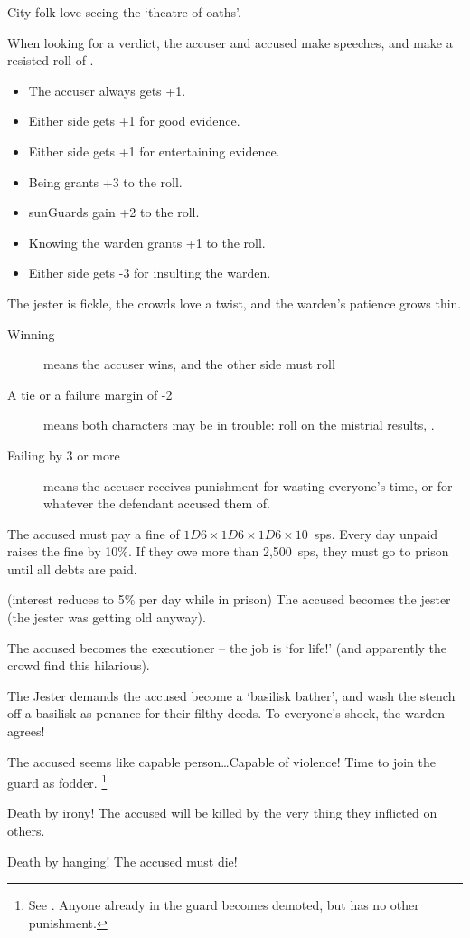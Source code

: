 \begin{multicols}{2}
City-folk love seeing the `theatre of oaths'.

When looking for a verdict, the accuser and accused make speeches, and make a resisted roll of .

\begin{itemize}
  \item
  The accuser always gets +1.
  \item
  Either side gets +1 for good evidence.
  \item
  Either side gets +1 for entertaining evidence.
  \item
  Being  grants +3 to the roll.
  \item
  \Glspl{sunGuard} gain +2 to the roll.
  \item
  Knowing the \gls{warden} grants +1 to the roll.
  \item
  Either side gets -3 for insulting the \gls{warden}.
\end{itemize}

The jester is fickle, the crowds love a twist, and the \gls{warden}'s patience grows thin.

\begin{description}
  \item[Winning]
  means the accuser wins, and the other side must roll 
  \item[A tie or a failure margin of -2]
  means both characters may be in trouble: roll on the mistrial results, .
  \item[Failing by 3 or more]
  means the accuser receives punishment for wasting everyone's time, or for whatever the defendant accused them of.
\end{description}

\begin{dlist}
  \item
  \ifodd\value{temperature}
    The accused must pay a fine of $1D6\times 1D6\times 1D6\times 10$~\glspl{sp}.
    Every day unpaid raises the fine by 10\%.
    If they owe more than 2,500~\glspl{sp}, they must go to prison until all debts are paid.

    (interest reduces to 5\% per day while in prison)
  \else
    The accused becomes the jester (the jester was getting old anyway).
  \fi
  \item
    The accused becomes the executioner -- the job is `for life!' (and apparently the crowd find this hilarious).
  \item
    The Jester demands the accused become a `basilisk bather', and wash the stench off a basilisk as penance for their filthy deeds.
    To everyone's shock, the \gls{warden} agrees!
  \item
  The accused seems like capable person\ldots Capable of violence!
  Time to join the \gls{guard} as fodder.%
  \footnote{See . Anyone already in the \gls{guard} becomes demoted, but has no other punishment.}
  \item
  Death by irony!
  The accused will be killed by the very thing they inflicted on others.
  \item
  Death by hanging!
  The accused must die!


\end{dlist}
\end{multicols}
